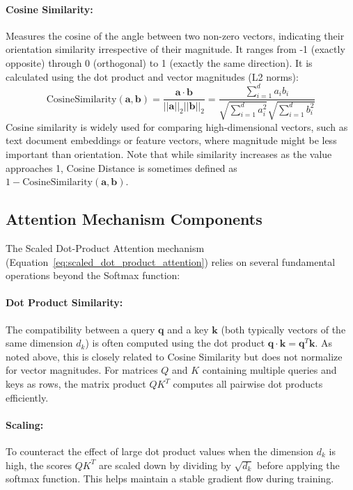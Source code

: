 \paragraph{Cosine Similarity:}
Measures the cosine of the angle between two non-zero vectors, indicating their orientation similarity irrespective of their magnitude. It ranges from -1 (exactly opposite) through 0 (orthogonal) to 1 (exactly the same direction). It is calculated using the dot product and vector magnitudes (L2 norms):
\begin{equation}
  \text{CosineSimilarity}(\bm{a}, \bm{b}) = \frac{\bm{a} \cdot \bm{b}}{||\bm{a}||_2 ||\bm{b}||_2} = \frac{\sum_{i=1}^d a_i b_i}{\sqrt{\sum_{i=1}^d a_i^2} \sqrt{\sum_{i=1}^d b_i^2}}
\end{equation}
Cosine similarity is widely used for comparing high-dimensional vectors, such as text document embeddings or feature vectors, where magnitude might be less important than orientation. Note that while similarity increases as the value approaches 1, Cosine Distance is sometimes defined as \( 1 - \text{CosineSimilarity}(\bm{a}, \bm{b}) \).

\subsection{Attention Mechanism Components}
The Scaled Dot-Product Attention mechanism (Equation~\ref{eq:scaled_dot_product_attention}) relies on several fundamental operations beyond the Softmax function:

\paragraph{Dot Product Similarity:}
The compatibility between a query \( \bm{q} \) and a key \( \bm{k} \) (both typically vectors of the same dimension \( d_k \)) is often computed using the dot product \( \bm{q} \cdot \bm{k} = \bm{q}^T \bm{k} \). As noted above, this is closely related to Cosine Similarity but does not normalize for vector magnitudes. For matrices \( Q \) and \( K \) containing multiple queries and keys as rows, the matrix product \( QK^T \) computes all pairwise dot products efficiently.

\paragraph{Scaling:}
To counteract the effect of large dot product values when the dimension \( d_k \) is high, the scores \( QK^T \) are scaled down by dividing by \( \sqrt{d_k} \) before applying the softmax function. This helps maintain a stable gradient flow during training.

